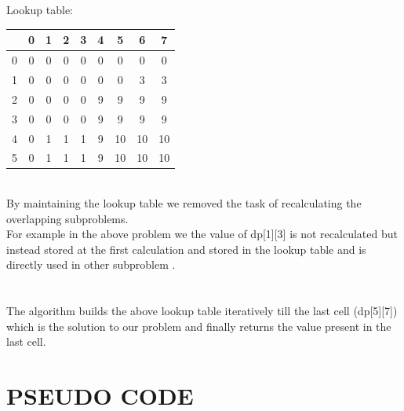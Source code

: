 \documentclass[twocolumn]{article}
\begin{document}
\vfill\eject
\\
\\
Lookup table:\\





\begin{center}
	\begin{tabular}{ |c | c | c | c | c | c | c | c | c| }
	\hline
	  &0&1&2&3&4&5&6&7\\
	 \hline
	0&0&0&0&0&0&0&0&0\\
	\hline
	1&0&0&0&0&0&0&3&3\\
\hline
	2&0&0&0&0&9&9&9&9\\
\hline
	3&0&0&0&0&9&9&9&9\\
\hline
	4&0&1&1&1&9&10&10&10\\
\hline
	5&0&1&1&1&9&10&10&10\\
	\hline
	\end{tabular}
\end{center}



\noindent\\
By maintaining the lookup table we removed the task of recalculating the overlapping subproblems.\\
\noindent
For example in the above problem we the value of dp[1][3] is not recalculated but instead stored at the first calculation and stored in the lookup table and is directly used in other subproblem .\\
\\
\noindent\\
The algorithm builds the above lookup table iteratively till the last cell (dp[5][7]) which is the solution to our problem and finally returns the value present in the last cell.

\section*{PSEUDO CODE
}
\end{document}
